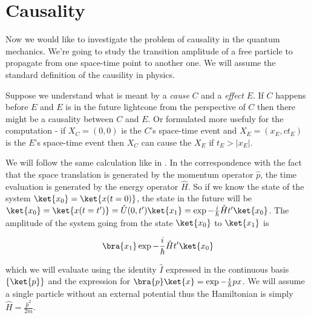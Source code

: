 \section{Causality}

Now we would like to investigate the problem of causality in the quantum mechanics. We're going to study the transition
amplitude of a free particle to propagate from one space-time point to another one. We will assume the standard definition
of the causility in physics.

\begin{definition}
    \label{df:causality}
    Suppose we understand what is meant by a \textit{cause} $C$ and a \textit{effect} $E$. If $C$ happens before $E$ and 
    $E$ is in the future lightcone from the perspective of $C$ then there might be a causality between $C$ and $E$.  Or
    formulated more usefuly for the computation - if $X_{C} = (0, 0)$ is the $C$'s space-time event and 
    $X_{E} = (x_{E}, ct_{E})$ is the $E$'s space-time event then $X_{C}$ can cause the $X_{E}$ if $t_{E} > |x_{E}|$.
\end{definition}

We will follow the same calculation like in \cite{peskin_schroeder}. In the correspondence with the fact that the space translation
is generated by the momentum operator $\hat{p}$, the time evaluation is generated by the energy operator $\hat{H}$. So
if we know the state of the system $\ket{x_{0}} = \ket{x(t=0)}$, the state in the future will be 
$\ket{x_{0}} = \ket{x(t=t')} = \hat{U}(0, t') \ket{x_{1}} = \exp{- \frac{i}{\hbar} \hat{H} t'} \ket{x_{0}}$. The amplitude of the
system going from the state $\ket{x_{0}}$ to $\ket{x_{1}}$ is 

\begin{equation}
    \bra{x_{1}} \exp{- \frac{i}{\hbar} \hat{H} t'}\ket{x_{0}}
\end{equation}

which we will evaluate using the identity $\hat{I}$ expressed in the continuous basis $\{\ket{p}\}$ and the expression for
$\bra{p}\ket{x} = \exp{- \frac{i}{\hbar} p x}$. We will assume a single particle without an external potential thus the
Hamiltonian is simply $\hat{H} = \frac{\hat{p}^{2}}{2m}$.

